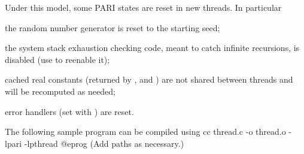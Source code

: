 
\noindent Under this model, some PARI states are reset in new threads. In
particular

\item the random number generator is reset to the starting seed;

\item the system stack exhaustion checking code, meant to catch infinite
recursions, is disabled (use  to reenable it);

\item cached real constants (returned by ,  and
) are not shared between threads and will be recomputed as
needed;

\item error handlers (set with ) are reset.

\noindent The following sample program can be compiled using
\bprog
    cc thread.c -o thread.o -lpari -lpthread
@eprog\noindent
(Add  paths as necessary.)

\noindent{}

\vfill\eject
